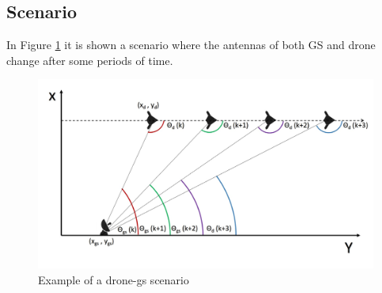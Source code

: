 \subsection{Scenario}
In Figure \ref{fig:drone_gs} it is shown a scenario where the antennas of both GS and drone change after some periods of time.

\begin{figure}
	\centering
	\includegraphics[scale=0.45]{figures/drone_gs_ex.jpg}
	\caption{Example of a drone-gs scenario}
	\label{fig:drone_gs}
\end{figure}

